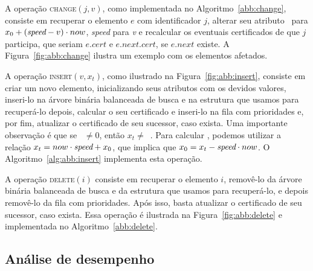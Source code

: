 





A operação \textsc{change}$(j, v)$, como implementada no Algoritmo~\ref{abb:change}, consiste em
recuperar o elemento $e$ com identificador $j$, alterar seu atributo \initv~para $x_0 +
(\textit{speed} - v)\cdot now$, \textit{speed} para \textit{v} e
recalcular os eventuais certificados de que $j$ participa, que
seriam $e.cert$ e $e.next.cert$, se $e.next$ existe.
A Figura~\ref{fig:abb:change} ilustra um exemplo com os elementos afetados.







A operação \textsc{insert}$(v, x_t)$, como ilustrado na Figura~\ref{fig:abb:insert}, consiste em
criar um novo elemento, inicializando seus atributos com os devidos valores, inseri-lo na
árvore binária balanceada de busca e na estrutura que usamos para
recuperá-lo depois, calcular o seu certificado e inseri-lo na fila
com prioridades e, por fim, atualizar o certificado de seu sucessor,
caso exista.
Uma importante observação é que se \now~$\neq 0$, então $x_t \neq$~\initv.
Para calcular \initv, podemos utilizar a relação
${x_t = now\cdot \textit{speed} + x_0}$, que implica que ${x_0 = x_t -
\textit{speed}\cdot now}$.
O Algoritmo~\ref{alg:abb:insert} implementa esta operação.





A operação \textsc{delete}$(i)$ consiste em recuperar o elemento
$i$, removê-lo da árvore binária balanceada de busca e da estrutura
que usamos para recuperá-lo, e depois removê-lo da fila com
prioridades.
Após isso, basta atualizar o certificado de seu sucessor, caso exista.
Essa operação é ilustrada na Figura~\ref{fig:abb:delete} e implementada no
Algoritmo~\ref{abb:delete}.



\FloatBarrier

\subsection{Análise de desempenho}\label{subsec:analise-de-desempenho-abb}

